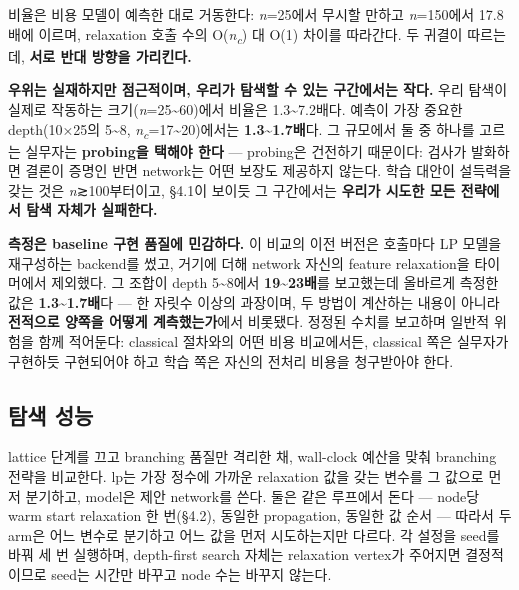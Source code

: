 \documentclass[final,5p,twocolumn]{elsarticle}
\begin{document}
비율은 비용 모델이 예측한 대로 거동한다: \textit{n}=25에서 무시할 만하고 \textit{n}=150에서 17.8배에 이르며, relaxation 호출 수의 O(\textit{n\textsubscript{c}}) 대 O(1) 차이를 따라간다. 두 귀결이 따르는데, \textbf{서로 반대 방향을 가리킨다.}

\textbf{우위는 실재하지만 점근적이며, 우리가 탐색할 수 있는 구간에서는 작다.} 우리 탐색이 실제로 작동하는 크기(\textit{n}=25\textasciitilde{}60)에서 비율은 1.3\textasciitilde{}7.2배다. 예측이 가장 중요한 depth(10×25의 5\textasciitilde{}8, \textit{n\textsubscript{c}}=17\textasciitilde{}20)에서는 \textbf{1.3\textasciitilde{}1.7배}다. 그 규모에서 둘 중 하나를 고르는 실무자는 \textbf{probing을 택해야 한다} — probing은 건전하기 때문이다: 검사가 발화하면 결론이 증명인 반면 network는 어떤 보장도 제공하지 않는다. 학습 대안이 설득력을 갖는 것은 \textit{n}≳100부터이고, §4.1이 보이듯 그 구간에서는 \textbf{우리가 시도한 모든 전략에서 탐색 자체가 실패한다.}

\textbf{측정은 baseline 구현 품질에 민감하다.} 이 비교의 이전 버전은 호출마다 LP 모델을 재구성하는 backend를 썼고, 거기에 더해 network 자신의 feature relaxation을 타이머에서 제외했다. 그 조합이 depth 5\textasciitilde{}8에서 \textbf{19\textasciitilde{}23배}를 보고했는데 올바르게 측정한 값은 \textbf{1.3\textasciitilde{}1.7배}다 — 한 자릿수 이상의 과장이며, 두 방법이 계산하는 내용이 아니라 \textbf{전적으로 양쪽을 어떻게 계측했는가}에서 비롯됐다. 정정된 수치를 보고하며 일반적 위험을 함께 적어둔다: classical 절차와의 어떤 비용 비교에서든, classical 쪽은 실무자가 구현하듯 구현되어야 하고 학습 쪽은 자신의 전처리 비용을 청구받아야 한다.

\subsection{탐색 성능}
lattice 단계를 끄고 branching 품질만 격리한 채, wall-clock 예산을 맞춰 branching 전략을 비교한다. lp는 가장 정수에 가까운 relaxation 값을 갖는 변수를 그 값으로 먼저 분기하고, model은 제안 network를 쓴다. 둘은 같은 루프에서 돈다 — node당 warm start relaxation 한 번(§4.2), 동일한 propagation, 동일한 값 순서 — 따라서 두 arm은 어느 변수로 분기하고 어느 값을 먼저 시도하는지만 다르다. 각 설정을 seed를 바꿔 세 번 실행하며, depth-first search 자체는 relaxation vertex가 주어지면 결정적이므로 seed는 시간만 바꾸고 node 수는 바꾸지 않는다.
\end{document}
